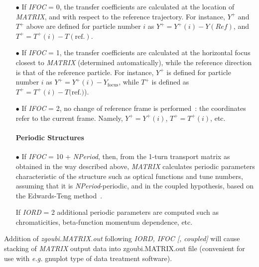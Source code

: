 \begin{itemize}
\item[$\bullet$] If \textsl{IFOC} = 0,  the transfer coefficients are calculated
at the location of \textsl{MATRIX}, and with respect to the reference trajectory. 
For instance, $ Y^+ $ and $ T^+ $ above are defined for particle number $ i $ as 
$Y^+=Y^+(i)-Y(Ref)$,  and $ T^+=T^+(i)-T(\textrm{ref.})$.  

\item[$\bullet$] If \textsl{IFOC} = 1, the transfer coefficients are calculated at the 
horizontal focus  closest to \textsl{MATRIX} (determined 
automatically), while the reference direction is that of the reference  particle. For 
instance, $ Y^+ $ is defined for particle number $ i $ as $ Y^+=Y^+(i) -Y_{\text{focus}} $, 
while  $ T^+ $ is defined as $ T^+=T^+(i)-T(\textrm{ref.)}$).  

\item[$\bullet$] If \textsl{IFOC} = 2, no change of reference frame is 
performed~: the coordinates refer to the current frame. Namely, $ Y^+=Y^+(i)$, 
$ T^+=T^+(i)$,  etc. \

\paragraph{\large Periodic Structures} 

\item[$\bullet$] If \textsl{IFOC} = 10  +  \textsl{NPeriod}, then, 
from the 1-turn transport matrix as obtained in the way described above,
 \textsl{MATRIX} calculates periodic parameters characteristic  of the structure 
such as  optical functions and tune numbers, assuming that it is \textsl{NPeriod}-periodic, 
and  in the coupled hypothesis, based on the Edwards-Teng method~\cite{Coupling}. 

If  \textsl{IORD} = 2 additional 
periodic parameters are computed such as chromaticities,  beta-function momentum dependence, 
 etc. 


\end{itemize}

 

\medskip

\noindent  Addition of \textsl{zgoubi.MATRIX.out} following \textsl{IORD, IFOC [, coupled]} will cause 
stacking of \textsl{MATRIX} output data 
into   zgoubi.MATRIX.out file (convenient for use with \emph{e.g.} gnuplot type of data treatment software). 

